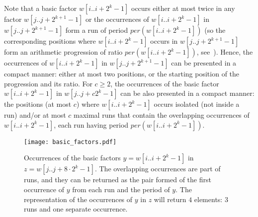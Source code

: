 \documentclass[final]{dmtcs-episciences}
\newcommand{\per}{{per}}
\begin{document}
Note that a basic factor $w[i..i+2^k-1]$ occurs either at most twice in any factor $w[j..j+2^{k+1}-1]$ or the occurrences of $w[i..i+2^k-1]$ in $w[j..j+2^{k+1}-1]$ form a run of period $\per(w[i..i+2^k-1])$ (so the corresponding positions where $w[i..i+2^k-1]$ occurs in $w[j..j+2^{k+1}-1]$ form an arithmetic progression of ratio $\per(w[i..i+2^k-1])$, see~\cite{KociumakaSPIRE2012}). Hence, the occurrences of  $w[i..i+2^k-1]$ in $w[j..j+2^{k+1}-1]$ can be presented in a compact manner: either at most two positions, or the starting position of the progression and its ratio. For $c\geq 2$, the occurrences of the basic factor $w[i..i+2^k-1]$ in $w[j..j+c 2^{k}-1]$ can be also presented in a compact manner: the positions (at most $c$) where $w[i..i+2^k-1]$ occurs isolated (not inside a run) and/or at most $c$ maximal runs that contain the overlapping occurrences of $w[i..i+2^k-1]$, each run having period $\per(w[i..i+2^k-1])$.

\begin{figure}\begin{center}
\texttt{[image: basic\_factors.pdf]}
\end{center}
\vspace*{-2.5cm}
\caption{Occurrences of the basic factors $y=w[i..i+2^k-1]$ in $z=w[j..j+8\cdot2^k-1]$. The overlapping occurrences are part of runs, and they can be returned as the pair formed of the first occurrence of $y$ from each run and the period of $y$. The representation of the occurrences of $y$ in $z$ will return $4$ elements: $3$ runs and one separate occurrence.}
\end{figure}
\end{document}
